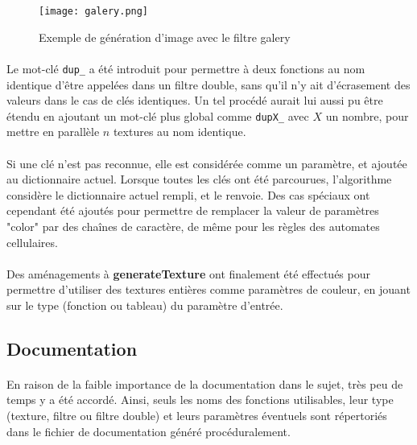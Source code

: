 \documentclass[a4paper]{article}
\begin{document}
\begin{figure}
    \centering
    \texttt{[image: galery.png]}
    \caption{Exemple de génération d'image avec le filtre galery}
    \label{fig:galery}
\end{figure}

\paragraph{}
Le mot-clé \texttt{dup\_} a été introduit pour permettre à deux fonctions au nom identique d'être appelées dans un filtre double, sans qu'il n'y ait d'écrasement des valeurs dans le cas de clés identiques. Un tel procédé aurait lui aussi pu être étendu en ajoutant un mot-clé plus global comme \texttt{dupX\_} avec $X$ un nombre, pour mettre en parallèle $n$ textures au nom identique.

\paragraph{}
Si une clé n'est pas reconnue, elle est considérée comme un paramètre, et ajoutée au dictionnaire actuel. Lorsque toutes les clés ont été parcourues, l'algorithme considère le dictionnaire actuel rempli, et le renvoie. Des cas spéciaux ont cependant été ajoutés pour permettre de remplacer la valeur de paramètres "color" par des chaînes de caractère, de même pour les règles des automates cellulaires.

\paragraph{}
Des aménagements à \textbf{generateTexture} ont finalement été effectués pour permettre d'utiliser des textures entières comme paramètres de couleur, en jouant sur le type (fonction ou tableau) du paramètre d'entrée.



\subsection{Documentation}
\label{sec:doc}

\paragraph{}
En raison de la faible importance de la documentation dans le sujet, très peu de temps y a été accordé. Ainsi, seuls les noms des fonctions utilisables, leur type (texture, filtre ou filtre double) et leurs paramètres éventuels sont répertoriés dans le fichier de documentation généré procéduralement.
\end{document}

